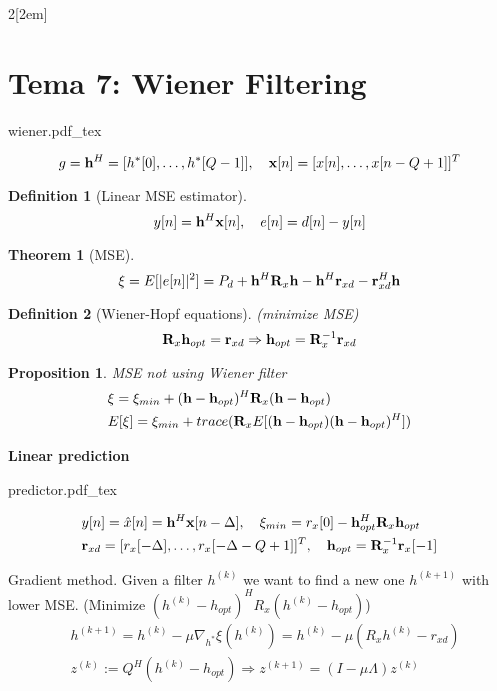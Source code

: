 \documentclass{myclass}
\newtheorem*{definition}{Definition}
\newtheorem*{theorem}{Theorem}
\newtheorem*{proposition}{Proposition}
\newcommand{\incfig}[1]{%
{\center
\def\svgwidth{0.9\columnwidth}
{#1.pdf_tex}
\par}
}
\begin{document}
\begin{multicols}{2}[\columnsep2em]
\section{Tema 7: Wiener Filtering}
\incfig{wiener}
\[
g = \vb{h}^H = [h^*[0], \ldots, h^*[Q-1]], \quad \vb{x}[n] = [x[n], \ldots, x[n-Q+1]]^T
\] 

\begin{definition}[Linear MSE estimator] 
\[
y[n]=\vb{h}^H\vb{x}[n], \quad e[n] = d[n]-y[n]
\] 
\end{definition}

\begin{theorem}[MSE]
 \[
\xi = E[|e[n]|^2] = P_d + \vb{h}^H\vb{R}_x\vb{h} - \vb{h}^H\vb{r}_{xd} -\vb{r}_{xd}^H\vb{h}
\] 
\end{theorem}

\begin{definition}[Wiener-Hopf equations](minimize MSE)
\[
\vb{R}_x\vb{h}_{opt}= \vb{r}_{xd} \Rightarrow \vb{h}_{opt}=\vb{R}_x ^{-1}\vb{r}_{xd}
\] 
\end{definition}

\begin{proposition}MSE not using Wiener filter 
\begin{align*}
&\xi = \xi _{min} + (\vb{h}-\vb{h}_{opt})^H\vb{R}_x(\vb{h}-\vb{h}_{opt}) \\
&E[\xi ]= \xi_{min} + trace(\vb{R}_xE[(\vb{h}-\vb{h}_{opt})(\vb{h}-\vb{h}_{opt})^H])
\end{align*}
\end{proposition}


\textbf{Linear prediction}
\incfig{predictor}

\begin{align*}
  & y[n] = \hat{x}[n] = \vb{h}^H\vb{x}[n-\Delta], \quad \xi _{min} = r_x[0]-\vb{h}_{opt}^H\vb{R}_x\vb{h}_{opt} \\
  & \vb{r}_{xd}=[r_x[-\Delta ], \ldots, r_x[-\Delta -Q+1]]^T,\quad \vb{h}_{opt} = \vb{R}_x ^{-1}\vb{r}_{x}[-1]
\end{align*}

Gradient method. Given a filter $h^{(k)}$ we want to find a new one $h^{(k+1)}$ with lower MSE. (Minimize $(h^{(k)}-h_{opt})^HR_x(h^{(k)}-h_{opt})$)
\begin{align*}
  & h^{(k+1)} = h^{(k)} - \mu \nabla_{h^*}\xi (h^{(k)}) = h^{(k)} - \mu(R_xh^{(k)} - r_{xd}) \\
  & z^{(k)} := Q^H(h^{(k)}-h_{opt}) \Rightarrow z^{(k+1)} = (I-\mu \Lambda)z^{(k)}
\end{align*}


\end{multicols}
\end{document}
